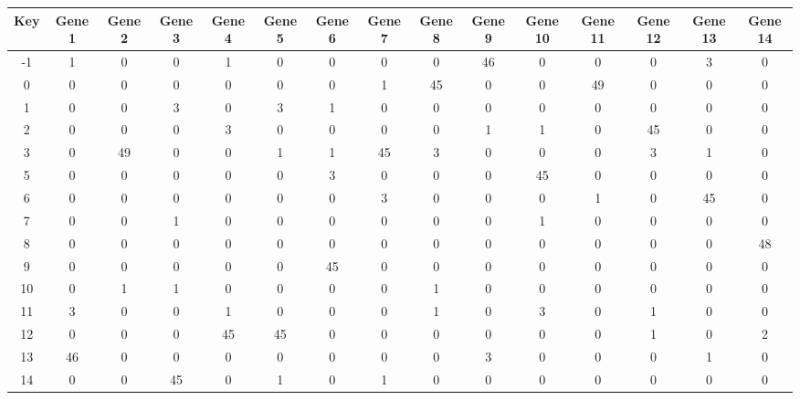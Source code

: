 \begin{tabular}{|c|c|c|c|c|c|c|c|c|c|c|c|c|c|c|}
\hline
Key & Gene 1 & Gene 2 & Gene 3 & Gene 4 & Gene 5 & Gene 6 & Gene 7 & Gene 8 & Gene 9 & Gene 10 & Gene 11 & Gene 12 & Gene 13 & Gene 14 \\
\hline
-1 & 1 & 0 & 0 & 1 & 0 & 0 & 0 & 0 & 46 & 0 & 0 & 0 & 3 & 0 \\
0 & 0 & 0 & 0 & 0 & 0 & 0 & 1 & 45 & 0 & 0 & 49 & 0 & 0 & 0 \\
1 & 0 & 0 & 3 & 0 & 3 & 1 & 0 & 0 & 0 & 0 & 0 & 0 & 0 & 0 \\
2 & 0 & 0 & 0 & 3 & 0 & 0 & 0 & 0 & 1 & 1 & 0 & 45 & 0 & 0 \\
3 & 0 & 49 & 0 & 0 & 1 & 1 & 45 & 3 & 0 & 0 & 0 & 3 & 1 & 0 \\
5 & 0 & 0 & 0 & 0 & 0 & 3 & 0 & 0 & 0 & 45 & 0 & 0 & 0 & 0 \\
6 & 0 & 0 & 0 & 0 & 0 & 0 & 3 & 0 & 0 & 0 & 1 & 0 & 45 & 0 \\
7 & 0 & 0 & 1 & 0 & 0 & 0 & 0 & 0 & 0 & 1 & 0 & 0 & 0 & 0 \\
8 & 0 & 0 & 0 & 0 & 0 & 0 & 0 & 0 & 0 & 0 & 0 & 0 & 0 & 48 \\
9 & 0 & 0 & 0 & 0 & 0 & 45 & 0 & 0 & 0 & 0 & 0 & 0 & 0 & 0 \\
10 & 0 & 1 & 1 & 0 & 0 & 0 & 0 & 1 & 0 & 0 & 0 & 0 & 0 & 0 \\
11 & 3 & 0 & 0 & 1 & 0 & 0 & 0 & 1 & 0 & 3 & 0 & 1 & 0 & 0 \\
12 & 0 & 0 & 0 & 45 & 45 & 0 & 0 & 0 & 0 & 0 & 0 & 1 & 0 & 2 \\
13 & 46 & 0 & 0 & 0 & 0 & 0 & 0 & 0 & 3 & 0 & 0 & 0 & 1 & 0 \\
14 & 0 & 0 & 45 & 0 & 1 & 0 & 1 & 0 & 0 & 0 & 0 & 0 & 0 & 0 \\
\hline
\end{tabular}